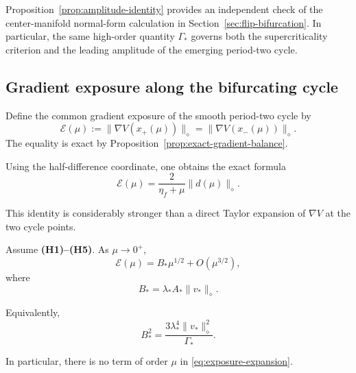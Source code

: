 \begin{remark}
\label{rem:coordinate-free-check}
Proposition~\ref{prop:amplitude-identity} provides an independent
check of the center-manifold normal-form calculation in
Section~\ref{sec:flip-bifurcation}.  In particular, the same
high-order quantity $\Gamma_*$ governs both the supercriticality
criterion and the leading amplitude of the emerging period-two
cycle.
\end{remark}

\subsection{Gradient exposure along the bifurcating cycle}
\label{subsec:gradient-exposure}

Define the common gradient exposure of the smooth period-two cycle
by
\begin{equation}
\mathscr E(\mu)
:=
\|\nabla V(x_+(\mu))\|_\diamond
=
\|\nabla V(x_-(\mu))\|_\diamond.
\label{eq:exposure-definition}
\end{equation}
The equality is exact by
Proposition~\ref{prop:exact-gradient-balance}.

Using the half-difference coordinate, one obtains the exact formula
\begin{equation}
\mathscr E(\mu)
=
\frac{2}{\eta_f+\mu}
\|d(\mu)\|_\diamond.
\label{eq:exact-exposure-d}
\end{equation}

This identity is considerably stronger than a direct Taylor
expansion of $\nabla V$ at the two cycle points.

\begin{theorem}
\label{thm:exposure-expansion}
Assume \textbf{(H1)--(H5)}.
As $\mu\to0^+$,
\begin{equation}
\mathscr E(\mu)
=
B_*\mu^{1/2}
+
O(\mu^{3/2}),
\label{eq:exposure-expansion}
\end{equation}
where
\begin{equation}
B_*
=
\lambda_*A_*
\|v_*\|_\diamond.
\label{eq:B-star}
\end{equation}

Equivalently,
\begin{equation}
B_*^2
=
\frac{
3\lambda_*^4
\|v_*\|_\diamond^2
}{
\Gamma_*
}.
\label{eq:B-star-Gamma}
\end{equation}

In particular, there is no term of order $\mu$ in
\eqref{eq:exposure-expansion}.
\end{theorem}

